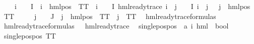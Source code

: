 \begin{isabellebody}
\ \ \ {\isachardoublequoteopen}{\isacharparenleft}{\kern0pt}{\isacharparenleft}{\kern0pt}{\isasymforall}i\ {\isasymin}\ {\isasymPhi}\ {\isacharbackquote}{\kern0pt}\ I{\isachardot}{\kern0pt}\ {\isasymexists}{\isasymalpha}{\isachardot}{\kern0pt}\ i\ {\isacharequal}{\kern0pt}\ hml{\isacharunderscore}{\kern0pt}pos\ {\isasymalpha}\ TT{\isacharparenright}{\kern0pt}\ {\isasymor}\ {\isacharparenleft}{\kern0pt}{\isasymexists}i\ {\isasymin}\ {\isasymPhi}\ {\isacharbackquote}{\kern0pt}\ I{\isachardot}{\kern0pt}\ hml{\isacharunderscore}{\kern0pt}ready{\isacharunderscore}{\kern0pt}trace\ i\ {\isasymand}\ {\isacharparenleft}{\kern0pt}{\isasymforall}j\ {\isasymin}\ {\isasymPhi}\ {\isacharbackquote}{\kern0pt}\ I{\isachardot}{\kern0pt}\ i\ {\isasymnoteq}\ j\ {\isasymlongrightarrow}\ {\isacharparenleft}{\kern0pt}{\isasymexists}{\isasymalpha}{\isachardot}{\kern0pt}\ j\ {\isacharequal}{\kern0pt}\ hml{\isacharunderscore}{\kern0pt}pos\ {\isasymalpha}\ TT{\isacharparenright}{\kern0pt}{\isacharparenright}{\kern0pt}{\isacharparenright}{\kern0pt}{\isacharparenright}{\kern0pt}{\isachardoublequoteclose}\isanewline
\ \ \ \ \ {\isachardoublequoteopen}{\isasymforall}j\ {\isasymin}\ {\isasymPhi}\ {\isacharbackquote}{\kern0pt}\ J{\isachardot}{\kern0pt}\ {\isasymexists}{\isasymalpha}{\isachardot}{\kern0pt}\ j\ {\isacharequal}{\kern0pt}\ {\isacharparenleft}{\kern0pt}hml{\isacharunderscore}{\kern0pt}pos\ {\isasymalpha}\ TT{\isacharparenright}{\kern0pt}\ {\isasymor}\ j\ {\isacharequal}{\kern0pt}\ TT{\isachardoublequoteclose}\ \isanewline
\isanewline
{}\isamarkupfalse%
\ hml{\isacharunderscore}{\kern0pt}ready{\isacharunderscore}{\kern0pt}trace{\isacharunderscore}{\kern0pt}formulas\isanewline
\ \ \isanewline
{\isachardoublequoteopen}hml{\isacharunderscore}{\kern0pt}ready{\isacharunderscore}{\kern0pt}trace{\isacharunderscore}{\kern0pt}formulas\ {\isasymequiv}\ {\isacharbraceleft}{\kern0pt}{\isasymphi}{\isachardot}{\kern0pt}\ hml{\isacharunderscore}{\kern0pt}ready{\isacharunderscore}{\kern0pt}trace\ {\isasymphi}{\isacharbraceright}{\kern0pt}{\isachardoublequoteclose}\isanewline
\isanewline
{}\isamarkupfalse%
\ single{\isacharunderscore}{\kern0pt}pos{\isacharunderscore}{\kern0pt}pos\ {\isacharcolon}{\kern0pt}{\isacharcolon}{\kern0pt}\ {\isachardoublequoteopen}{\isacharparenleft}{\kern0pt}{\isacharprime}{\kern0pt}a{\isacharcomma}{\kern0pt}\ {\isacharprime}{\kern0pt}i{\isacharparenright}{\kern0pt}\ hml\ {\isasymRightarrow}\ bool{\isachardoublequoteclose}\isanewline
\ \ \isanewline
{\isachardoublequoteopen}single{\isacharunderscore}{\kern0pt}pos{\isacharunderscore}{\kern0pt}pos\ TT{\isachardoublequoteclose}\ {\isacharbar}{\kern0pt}\isanewline

\end{isabellebody}
